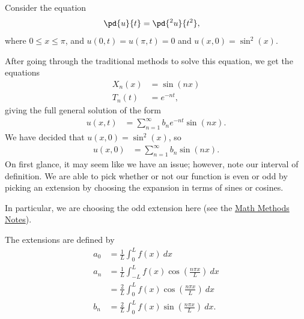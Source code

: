 \documentclass[10pt]{mypackage}
\begin{document}
\begin{example}
  Consider the equation
  \begin{align*}
    \pd{u}{t} &= \pd{^2u}{t^2},
  \end{align*}
  where $0 \leq x \leq \pi$, and $u\left( 0,t \right) = u\left( \pi,t \right) = 0$ and $u\left( x,0 \right) = \sin^2(x)$.\newline

  After going through the traditional methods to solve this equation, we get the equations
  \begin{align*}
    X_n(x) &= \sin\left( nx \right)\\
    T_n(t) &= e^{-nt},
  \end{align*}
  giving the full general solution of the form
  \begin{align*}
    u\left( x,t \right) &= \sum_{n=1}^{\infty}b_ne^{-nt}\sin\left( nx \right).
  \end{align*}
  We have decided that $u\left( x,0 \right) = \sin^2\left( x \right)$, so
  \begin{align*}
    u\left( x,0 \right) &= \sum_{n=1}^{\infty}b_n\sin\left( nx \right).
  \end{align*}
  On first glance, it may seem like we have an issue; however, note our interval of definition. We are able to pick whether or not our function is even or odd by picking an extension by choosing the expansion in terms of sines or cosines.\newline

  In particular, we are choosing the odd extension here (see the \href{https://ai.avinash-iyer.com/Classes_and_Homework/College/Y4/Y4S1,\%20Math\%20Methods/math_methods_notes.pdf}{Math Methods Notes}).\newline

  The extensions are defined by
  \begin{align*}
    a_0 &= \frac{1}{L}\int_{0}^{L} f(x)\:dx\\
    a_n &= \frac{1}{L}\int_{-L}^{L} f(x)\cos\left( \frac{n\pi x}{L} \right)\:dx\\
        &= \frac{2}{L}\int_{0}^{L} f(x)\cos\left( \frac{n\pi x}{L} \right)\:dx\\
    b_n &= \frac{2}{L}\int_{0}^{L} f(x)\sin\left( \frac{n\pi x}{L} \right)\:dx.
  \end{align*}
\end{example}
\end{document}
